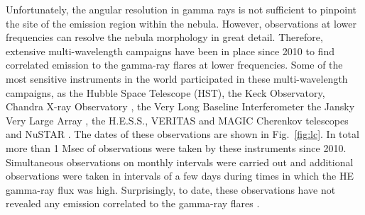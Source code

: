 Unfortunately, the angular resolution in gamma rays is not sufficient to pinpoint the site of the emission region within the nebula. However, observations at lower frequencies can resolve the nebula morphology in great detail. Therefore, extensive multi-wavelength campaigns have been in place since 2010 to find correlated emission to the gamma-ray flares at lower frequencies. Some of the most sensitive instruments in the world participated in these multi-wavelength campaigns, as the Hubble Space Telescope (HST), the Keck Observatory, Chandra X-ray Observatory \citep{Weisskopf2013,rudy2015}, the Very Long Baseline Interferometer \citep{Lobanov2011}  the Jansky Very Large Array \citep{Bietenholz2014}, the H.E.S.S., VERITAS and MAGIC Cherenkov telescopes \citep{Abramowski2014,Aliu2014,Aleksic2015} and NuSTAR \citep{Madsen2015}. The dates of these observations are shown in Fig.~\ref{fig:lc}. In total more than 1 Msec of observations were taken by these  instruments since 2010. Simultaneous observations on monthly intervals were carried out and additional observations were taken in intervals of a few days during times in which the HE gamma-ray flux was high. Surprisingly, to date, these observations have not revealed any emission correlated to the gamma-ray flares \citep{Weisskopf2013,rudy2015}. 
